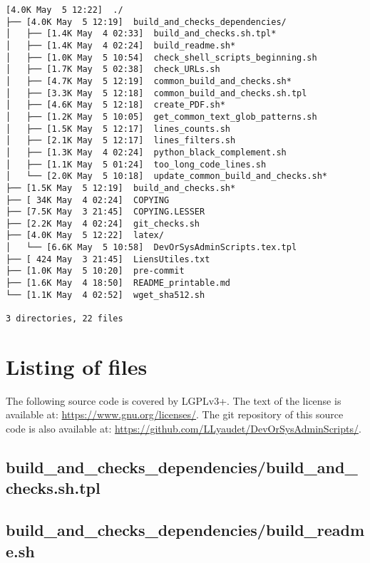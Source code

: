 \documentclass{article}
\begin{document}
\begin{verbatim}
[4.0K May  5 12:22]  ./
├── [4.0K May  5 12:19]  build_and_checks_dependencies/
│   ├── [1.4K May  4 02:33]  build_and_checks.sh.tpl*
│   ├── [1.4K May  4 02:24]  build_readme.sh*
│   ├── [1.0K May  5 10:54]  check_shell_scripts_beginning.sh
│   ├── [1.7K May  5 02:38]  check_URLs.sh
│   ├── [4.7K May  5 12:19]  common_build_and_checks.sh*
│   ├── [3.3K May  5 12:18]  common_build_and_checks.sh.tpl
│   ├── [4.6K May  5 12:18]  create_PDF.sh*
│   ├── [1.2K May  5 10:05]  get_common_text_glob_patterns.sh
│   ├── [1.5K May  5 12:17]  lines_counts.sh
│   ├── [2.1K May  5 12:17]  lines_filters.sh
│   ├── [1.3K May  4 02:24]  python_black_complement.sh
│   ├── [1.1K May  5 01:24]  too_long_code_lines.sh
│   └── [2.0K May  5 10:18]  update_common_build_and_checks.sh*
├── [1.5K May  5 12:19]  build_and_checks.sh*
├── [ 34K May  4 02:24]  COPYING
├── [7.5K May  3 21:45]  COPYING.LESSER
├── [2.2K May  4 02:24]  git_checks.sh
├── [4.0K May  5 12:22]  latex/
│   └── [6.6K May  5 10:58]  DevOrSysAdminScripts.tex.tpl
├── [ 424 May  3 21:45]  LiensUtiles.txt
├── [1.0K May  5 10:20]  pre-commit
├── [1.6K May  4 18:50]  README_printable.md
└── [1.1K May  4 02:52]  wget_sha512.sh

3 directories, 22 files
\end{verbatim}

\section{Listing of files}
\label{section:listing}

The following source code is covered by LGPLv3+.
The text of the license is available at:
\url{https://www.gnu.org/licenses/}.
The git repository of this source code is also available at:
\url{https://github.com/LLyaudet/DevOrSysAdminScripts/}.


\subsection{
  build\_and\_checks\_dependencies/build\_and\_checks.sh.tpl
}
\label{
  build_and_checks_dependencies:build_and_checksshtpl
}



\subsection{
  build\_and\_checks\_dependencies/build\_readme.sh
}
\label{
  build_and_checks_dependencies:build_readmesh
}
\end{document}
